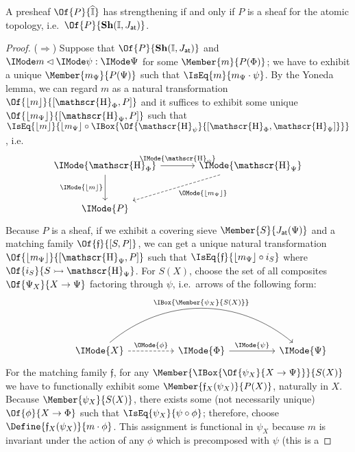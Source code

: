 \documentclass{article}
\DeclareMathOperator\OpYoneda{\mathscr{H}}
\newcommand\Yoneda[1]{\OpYoneda_{#1}}
\newcommand\Psh[1]{\widehat{#1}}
\newcommand\Sh[1]{\mathbf{Sh} (#1)}
\newcommand\JAtomic{J_{\mathsf{at}}}
\newcommand\Emb[1]{\lfloor{#1}\rfloor}
\begin{document}
\begin{thm}\label{thm:strengthening}
  A presheaf $\Of{P}{\Psh{\CatI}}$ has strengthening if and only if $P$ is a sheaf for the
  atomic topology, i.e.\ $\Of{P}{\Sh{\CatI,\JAtomic}}$.
\end{thm}
\begin{proof}
  ($\Rightarrow$) Suppose that $\Of{P}{\Sh{\CatI,\JAtomic}}$ and
  $\Supports{\Psi}{\psi}{m}$ for some $\Member{m}{P(\Phi)}$; we have
  to exhibit a unique $\Member{m_\Psi}{P(\Psi)}$ such that
  $\IsEq{m}{m_\Psi\cdot\psi}$.
%
  By the Yoneda lemma, we can regard $m$ as a natural transformation
  $\Of{\Emb{m}}{[\Yoneda{\Phi},P]}$ and it suffices to exhibit some unique
  $\Of{\Emb{m_\Psi}}{[\Yoneda{\Psi},P]}$ such that
  $\IsEq{\Emb{m}}{\Emb{m_\Psi}\circ\IBox{\Of{\Yoneda{\psi}}{[\Yoneda{\Phi},\Yoneda{\Psi}]}}}$, i.e.\
  \[
    \begin{tikzcd}[sep=large]
      \IMode{\Yoneda{\Phi}}
      \arrow[r,"\IMode{\Yoneda{\psi}}"]
      \arrow[d,swap,"\IMode{\Emb{m}}"]
      &
      \IMode{\Yoneda{\Psi}}
      \arrow[dl,dashed,"\OMode{\Emb{m_\Psi}}"]
      \\
      \IMode{P}
    \end{tikzcd}
  \]
  Because $P$ is a sheaf, if we exhibit a covering sieve
  $\Member{S}{\JAtomic(\Psi)}$ and a matching family
  $\Of{\mathfrak{f}}{[S,P]}$, we can get a unique natural transformation
  $\Of{\Emb{m_\Psi}}{[\Yoneda{\Psi},P]}$ such that
  $\IsEq{\mathfrak{f}}{\Emb{m_\Psi}\circ i_S}$ where
  $\Of{i_S}{\Mono{S}{\Yoneda{\Psi}}}$. For $S(X)$, choose the set of
  all composites $\Of{\Psi_X}{X\to\Psi}$ factoring through $\psi$,
  i.e.\ arrows of the following form:
  \[
    \begin{tikzcd}[sep=huge]
      &
      \IMode{X}
      \arrow[r,dashed,"\OMode{\phi}"]
      \arrow[rr,bend left=40,"\IBox{\Member{\psi_X}{S(X)}}"]
      &
      \IMode{\Phi}
      \arrow[r,"\IMode{\psi}"]
      &
      \IMode{\Psi}
    \end{tikzcd}
  \]
  For the matching family $\mathfrak{f}$, for any
  $\Member{\IBox{\Of{\psi_X}{X\to\Psi}}}{S(X)}$ we have to
  functionally exhibit some $\Member{\mathfrak{f}_X(\psi_X)}{P(X)}$,
  naturally in $X$. Because $\Member{\psi_X}{S(X)}$, there exists some
  (not necessarily unique) $\Of{\phi}{X\to\Phi}$ such that
  $\IsEq{\psi_X}{\psi\circ\phi}$; therefore, choose
  $\Define{\mathfrak{f}_X(\psi_X)}{m\cdot\phi}$. This assignment is
  functional in $\psi_X$ because $m$ is invariant under the
  action of any $\phi$ which is precomposed with $\psi$ (this is a

\end{proof}
\end{document}
